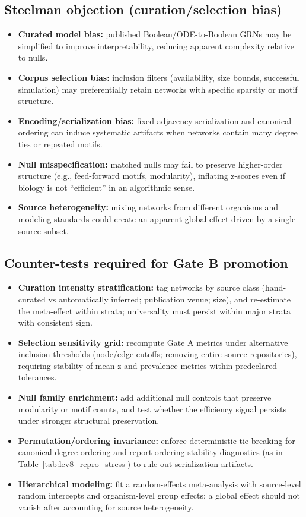 \documentclass[11pt]{article}
\begin{document}
\subsection*{Steelman objection (curation/selection bias)}
\begin{itemize}
    \item \textbf{Curated model bias:} published Boolean/ODE-to-Boolean GRNs may be simplified to improve interpretability, reducing apparent complexity relative to nulls.
    \item \textbf{Corpus selection bias:} inclusion filters (availability, size bounds, successful simulation) may preferentially retain networks with specific sparsity or motif structure.
    \item \textbf{Encoding/serialization bias:} fixed adjacency serialization and canonical ordering can induce systematic artifacts when networks contain many degree ties or repeated motifs.
    \item \textbf{Null misspecification:} matched nulls may fail to preserve higher-order structure (e.g., feed-forward motifs, modularity), inflating z-scores even if biology is not ``efficient'' in an algorithmic sense.
    \item \textbf{Source heterogeneity:} mixing networks from different organisms and modeling standards could create an apparent global effect driven by a single source subset.
\end{itemize}

\subsection*{Counter-tests required for Gate B promotion}
\begin{itemize}
    \item \textbf{Curation intensity stratification:} tag networks by source class (hand-curated vs automatically inferred; publication venue; size), and re-estimate the meta-effect within strata; universality must persist within major strata with consistent sign.
    \item \textbf{Selection sensitivity grid:} recompute Gate A metrics under alternative inclusion thresholds (node/edge cutoffs; removing entire source repositories), requiring stability of mean z and prevalence metrics within predeclared tolerances.
    \item \textbf{Null family enrichment:} add additional null controls that preserve modularity or motif counts, and test whether the efficiency signal persists under stronger structural preservation.
    \item \textbf{Permutation/ordering invariance:} enforce deterministic tie-breaking for canonical degree ordering and report ordering-stability diagnostics (as in Table~\ref{tab:lev8_repro_stress}) to rule out serialization artifacts.
    \item \textbf{Hierarchical modeling:} fit a random-effects meta-analysis with source-level random intercepts and organism-level group effects; a global effect should not vanish after accounting for source heterogeneity.
\end{itemize}
\end{document}
